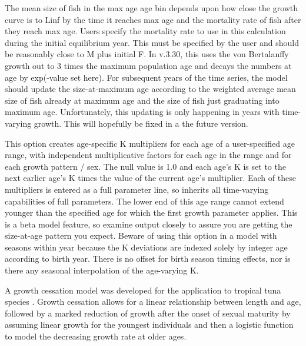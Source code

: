 	
The mean size of fish in the max age age bin depends upon how close the growth curve is to Linf by the time it reaches max age and the mortality rate of fish after they reach max age. Users specify the mortality rate to use in this calculation during the initial equilibrium year. This must be specified by the user and should be reasonably close to M plus initial F. In v.3.30, this uses the von Bertalanffy growth out to 3 times the maximum population age and decays the numbers at age by exp(-value set here). For subsequent years of the time series, the model should update the size-at-maximum age according to the weighted average mean size of fish already at maximum age and the size of fish just graduating into maximum age. Unfortunately, this updating is only happening in years with time-varying growth. This will hopefully be fixed in a the future version.
	
This option creates age-specific K multipliers for each age of a user-specified age range, with independent multiplicative factors for each age in the range and for each growth pattern / sex. The null value is 1.0 and each age's K is set to the next earlier age's K times the value of the current age's multiplier. Each of these multipliers is entered as a full parameter line, so inherits all time-varying capabilities of full parameters. The lower end of this age range cannot extend younger than the specified age for which the first growth parameter applies. This is a beta model feature, so examine output closely to assure you are getting the size-at-age pattern you expect. Beware of using this option in a model with seasons within year because the K deviations are indexed solely by integer age according to birth year. There is no offset for birth season timing effects, nor is there any seasonal interpolation of the age-varying K.

\hypertarget{GrowthCessation}{}
A growth cessation model was developed for the application to tropical tuna species \citep{maunder-growth-2018}. Growth cessation allows for a linear relationship between length and age, followed by a marked reduction of growth after the onset of sexual maturity by assuming linear growth for the youngest individuals and then a logistic function to model the decreasing growth rate at older ages.

